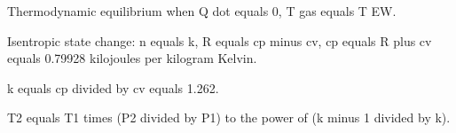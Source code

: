 Thermodynamic equilibrium when Q dot equals 0, T gas equals T EW.  

Isentropic state change:  
n equals k, R equals cp minus cv, cp equals R plus cv equals 0.79928 kilojoules per kilogram Kelvin.  

k equals cp divided by cv equals 1.262.  

T2 equals T1 times (P2 divided by P1) to the power of (k minus 1 divided by k).